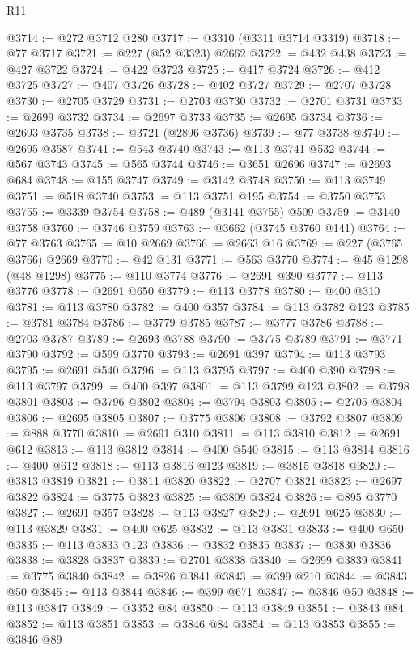 \begin{lexlean}{R11}
\begin{coremodule}
@3714 := @272 @3712 @280
@3717 := @3310 (@3311 @3714 @3319)
@3718 := @77 @3717
@3721 := @227 (@52 @3323) @2662
@3722 := @432 @438
@3723 := @427 @3722
@3724 := @422 @3723
@3725 := @417 @3724
@3726 := @412 @3725
@3727 := @407 @3726
@3728 := @402 @3727
@3729 := @2707 @3728
@3730 := @2705 @3729
@3731 := @2703 @3730
@3732 := @2701 @3731
@3733 := @2699 @3732
@3734 := @2697 @3733
@3735 := @2695 @3734
@3736 := @2693 @3735
@3738 := @3721 (@2896 @3736)
@3739 := @77 @3738
@3740 := @2695 @3587
@3741 := @543 @3740
@3743 := @113 @3741 @532
@3744 := @567 @3743
@3745 := @565 @3744
@3746 := @3651 @2696
@3747 := @2693 @684
@3748 := @155 @3747
@3749 := @3142 @3748
@3750 := @113 @3749
@3751 := @518 @3740
@3753 := @113 @3751 @195
@3754 := @3750 @3753
@3755 := @3339 @3754
@3758 := @489 (@3141 @3755) @509
@3759 := @3140 @3758
@3760 := @3746 @3759
@3763 := @3662 (@3745 @3760 @141)
@3764 := @77 @3763
@3765 := @10 @2669
@3766 := @2663 @16
@3769 := @227 (@3765 @3766) @2669
@3770 := @42 @131
@3771 := @563 @3770
@3774 := @45 @1298 (@48 @1298)
@3775 := @110 @3774
@3776 := @2691 @390
@3777 := @113 @3776
@3778 := @2691 @650
@3779 := @113 @3778
@3780 := @400 @310
@3781 := @113 @3780
@3782 := @400 @357
@3784 := @113 @3782 @123
@3785 := @3781 @3784
@3786 := @3779 @3785
@3787 := @3777 @3786
@3788 := @2703 @3787
@3789 := @2693 @3788
@3790 := @3775 @3789
@3791 := @3771 @3790
@3792 := @599 @3770
@3793 := @2691 @397
@3794 := @113 @3793
@3795 := @2691 @540
@3796 := @113 @3795
@3797 := @400 @390
@3798 := @113 @3797
@3799 := @400 @397
@3801 := @113 @3799 @123
@3802 := @3798 @3801
@3803 := @3796 @3802
@3804 := @3794 @3803
@3805 := @2705 @3804
@3806 := @2695 @3805
@3807 := @3775 @3806
@3808 := @3792 @3807
@3809 := @888 @3770
@3810 := @2691 @310
@3811 := @113 @3810
@3812 := @2691 @612
@3813 := @113 @3812
@3814 := @400 @540
@3815 := @113 @3814
@3816 := @400 @612
@3818 := @113 @3816 @123
@3819 := @3815 @3818
@3820 := @3813 @3819
@3821 := @3811 @3820
@3822 := @2707 @3821
@3823 := @2697 @3822
@3824 := @3775 @3823
@3825 := @3809 @3824
@3826 := @895 @3770
@3827 := @2691 @357
@3828 := @113 @3827
@3829 := @2691 @625
@3830 := @113 @3829
@3831 := @400 @625
@3832 := @113 @3831
@3833 := @400 @650
@3835 := @113 @3833 @123
@3836 := @3832 @3835
@3837 := @3830 @3836
@3838 := @3828 @3837
@3839 := @2701 @3838
@3840 := @2699 @3839
@3841 := @3775 @3840
@3842 := @3826 @3841
@3843 := @399 @210
@3844 := @3843 @50
@3845 := @113 @3844
@3846 := @399 @671
@3847 := @3846 @50
@3848 := @113 @3847
@3849 := @3352 @84
@3850 := @113 @3849
@3851 := @3843 @84
@3852 := @113 @3851
@3853 := @3846 @84
@3854 := @113 @3853
@3855 := @3846 @89

\end{coremodule}
\end{lexlean}

